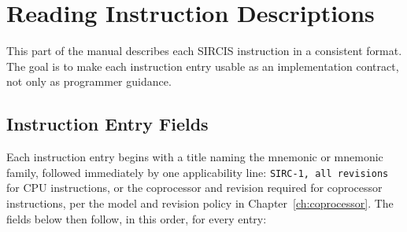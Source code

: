 \chapter{Reading Instruction Descriptions}
\label{ch:reading-instructions}

This part of the manual describes each SIRCIS instruction in a consistent format. The goal is to make each instruction
entry usable as an implementation contract, not only as programmer guidance.

\section{Instruction Entry Fields}

Each instruction entry begins with a title naming the mnemonic or mnemonic family, followed immediately by one
applicability line: \texttt{SIRC-1, all revisions} for CPU instructions, or the coprocessor and revision required for
coprocessor instructions, per the model and revision policy in Chapter~\ref{ch:coprocessor}. The fields below then
follow, in this order, for every entry:

